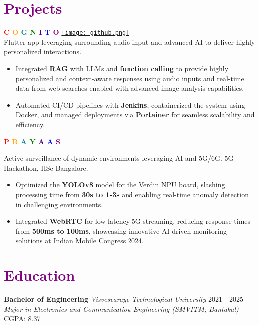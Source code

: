 \documentclass[a4paper,10pt]{article}
\begin{document}
\section*{\textcolor{purple}{Projects}}
\textbf{
    \textcolor{red}{C}%
    \textcolor{orange}{O}%
    \textcolor{teal}{G}%
    \textcolor{green}{N}%
    \textcolor{indigo}{I}%
    \textcolor{blue}{T}%
    \textcolor{purple}{O}%
} \hfill \href{https://github.com/Vinayy25/cognito}{\texttt{[image: github.png]}} \\
Flutter app leveraging surrounding audio input and advanced AI to deliver highly personalized interactions.
\begin{itemize}[leftmargin=*]
\item Integrated \textbf{RAG} with LLMs and \textbf{function calling} to provide highly personalized and context-aware responses using audio inputs and real-time data from web searches enabled with advanced image analysis capabilities.

    \item Automated CI/CD pipelines with \textbf{Jenkins}, containerized the system using Docker, and managed deployments via \textbf{Portainer} for seamless scalability and efficiency.

\end{itemize}



\textbf{
    \textcolor{red}{P}%
    \textcolor{orange}{R}%
    \textcolor{teal}{A}%
    \textcolor{green}{Y}%
    \textcolor{indigo}{A}%
    \textcolor{blue}{A}%
    \textcolor{purple}{S}%
}

Active surveillance of dynamic environments leveraging AI and 5G/6G. 5G Hackathon, IISc Bangalore.
\begin{itemize}[leftmargin=*]
    \item Optimized the \textbf{YOLOv8} model for the Verdin NPU board, slashing processing time from \textbf{30s to 1-3s} and enabling real-time anomaly detection in challenging environments.
    \item Integrated \textbf{WebRTC} for low-latency 5G streaming, reducing response times from \textbf{500ms to 100ms}, showcasing innovative AI-driven monitoring solutions at Indian Mobile Congress 2024.
\end{itemize}

\section*{\textcolor{purple}{Education}}
\textbf{Bachelor of Engineering} \hfill \textit{Visvesvaraya Technological University} \hfill 2021 - 2025 \\
\textit{Major in Electronics and Communication Engineering (SMVITM, Bantakal)} \hfill CGPA: 8.37 \\
\end{document}
